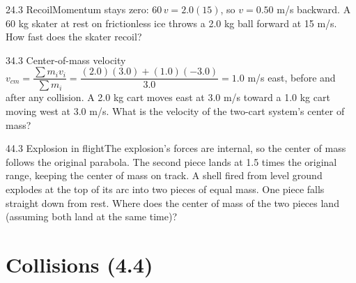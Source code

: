 \documentclass[11pt]{article}
\begin{document}
\begin{q}{2}{4.3 Recoil}{Momentum stays zero: $60\,v = 2.0(15)$, so $v = 0.50$ m/s backward.}
A 60 kg skater at rest on frictionless ice throws a 2.0 kg ball forward at 15 m/s. How fast does the skater recoil?
\end{q}
\begin{q}{3}{4.3 Center-of-mass velocity}{$v_{cm} = \dfrac{\sum m_iv_i}{\sum m_i} = \dfrac{(2.0)(3.0) + (1.0)(-3.0)}{3.0} = 1.0$ m/s east, before and after any collision.}
A 2.0 kg cart moves east at 3.0 m/s toward a 1.0 kg cart moving west at 3.0 m/s. What is the velocity of the two-cart system's center of mass?
\end{q}
\begin{q}{4}{4.3 Explosion in flight}{The explosion's forces are internal, so the center of mass follows the original parabola. The second piece lands at 1.5 times the original range, keeping the center of mass on track.}
A shell fired from level ground explodes at the top of its arc into two pieces of equal mass. One piece falls straight down from rest. Where does the center of mass of the two pieces land (assuming both land at the same time)?
\end{q}

\section{Collisions (4.4)}
\end{document}
